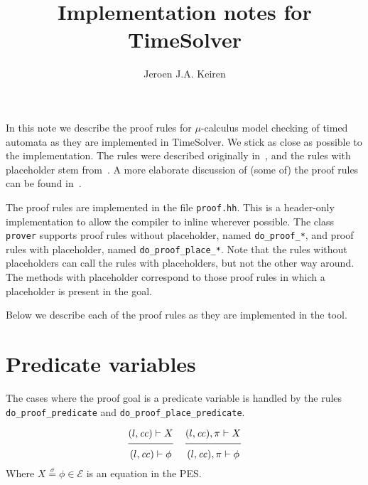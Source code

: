 \documentclass{article}
\title{Implementation notes for TimeSolver}
\author{Jeroen J.A. Keiren}
\newcommand{\proofrule}[3][]{#1 \frac{\raisebox{.7ex}{\normalsize{$#2$}}}
  {\raisebox{-1.0ex}{\normalsize{$#3$}}}}
\newcommand{\E}{\mathcal{E}}
\newcommand{\eqsigma}{\stackrel{\sigma}{=}}
\newcommand{\placeholder}[1][]{\pi_{#1}}
\newcommand{\loc}{l}
\newcommand{\region}{\mathit{cc}}
\begin{document}
\maketitle

In this note we describe the proof rules for $\mu$-calculus model checking of
timed automata as they are implemented in TimeSolver. We stick as close as
possible to the implementation. The rules were described originally
in~\cite{ZC:05rtss}, and the rules with placeholder stem from~\cite{FC:14}. A
more elaborate discussion of (some of) the proof rules can be found
in~\cite{FC:14report}.

The proof rules are implemented in the file \texttt{proof.hh}. This is a
header-only implementation to allow the compiler to inline wherever possible.
The class \texttt{prover} supports proof rules without placeholder, named
\texttt{do\_proof\_*}, and proof rules with placeholder, named
\texttt{do\_proof\_place\_*}. Note that the rules without placeholders can call
the rules with placeholders, but not the other way around. The methods with
placeholder correspond to those proof rules in which a placeholder is present in
the goal. 

Below we describe each of the proof rules as they are implemented in the tool.

\section{Predicate variables}
The cases where the proof goal is a predicate variable is handled by the rules
\texttt{do\_proof\_predicate} and \texttt{do\_proof\_place\_predicate}.

\[
\proofrule
{(\loc, \region) \vdash X}
{(\loc, \region) \vdash \phi}
%
\quad
%
\proofrule
{(\loc, \region), \placeholder \vdash X}
{(\loc, \region), \placeholder \vdash \phi}
\]
Where $X \eqsigma \phi \in \E$ is an equation in the PES.
\end{document}
